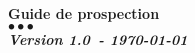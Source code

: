 \documentclass[a4paper, oneside, 12pt, french]{article}
\newcommand{\NUMREV}{Version 1.0}
\newcommand{\DATEREV}{\today}
\begin{document}




\newpage

\begin{center}
\huge \bf Guide de prospection \\
\textcolor{Symeos_Red}{$\bullet \bullet$}\textcolor{Symeos_Grey}{$\bullet$}\\
\small \textit{\NUMREV \ - \DATEREV} 
\end{center}
\end{document}
